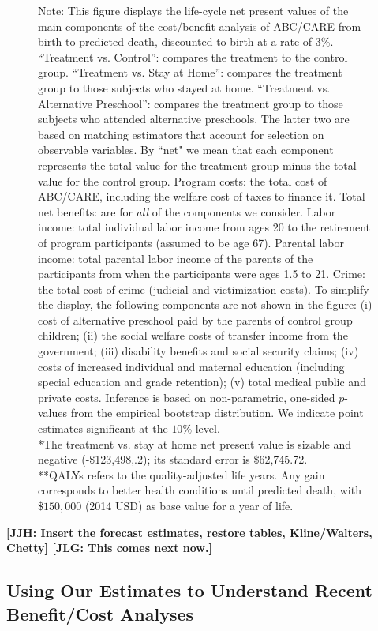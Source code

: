 \begin{figure}
Note: This figure displays the life-cycle net present values of the main components of the cost/benefit analysis of ABC/CARE from birth to predicted death, discounted to birth at a rate of 3\%. ``Treatment vs. Control'': compares the treatment to the control group. ``Treatment vs. Stay at Home'': compares the treatment group to those subjects who stayed at home. ``Treatment vs. Alternative Preschool'': compares the treatment group to those subjects who attended alternative preschools. The latter two are based on matching estimators that account for selection on observable variables. By ``net" we mean that each component represents the total value for the treatment group minus the total value for the control group. Program costs: the total cost of ABC/CARE, including the welfare cost of taxes to finance it. Total net benefits: are for \textit{all} of the components we consider. Labor income: total individual labor income from ages 20 to the retirement of program participants (assumed to be age 67). Parental labor income: total parental labor income of the parents of the participants from when the participants were ages 1.5 to 21. Crime: the total cost of crime (judicial and victimization costs). To simplify the display, the following components are not shown in the figure: (i) cost of alternative preschool paid by the parents of control group children; (ii) the social welfare costs of transfer income from the government; (iii) disability benefits and social security claims; (iv) costs of increased individual and maternal education (including special education and grade retention); (v) total medical public and private costs. Inference is based on non-parametric, one-sided $p$-values from the empirical bootstrap distribution. We indicate point estimates significant at the $10\%$ level.\\
*The treatment vs. stay at home net present value is sizable and negative (-\$123,498,.2); its standard error is \$62,745.72.\\
**QALYs refers to the quality-adjusted life years. Any gain corresponds to better health conditions until predicted death, with $\$150,000$ (2014 USD) as base value for a year of life.\\
\end{figure}

\textbf{[JJH: Insert the forecast estimates, restore tables, Kline/Walters, Chetty] [JLG: This comes next now.]}

\subsection{Using Our Estimates to Understand Recent Benefit/Cost Analyses}\label{appendix:bcaestimates}

